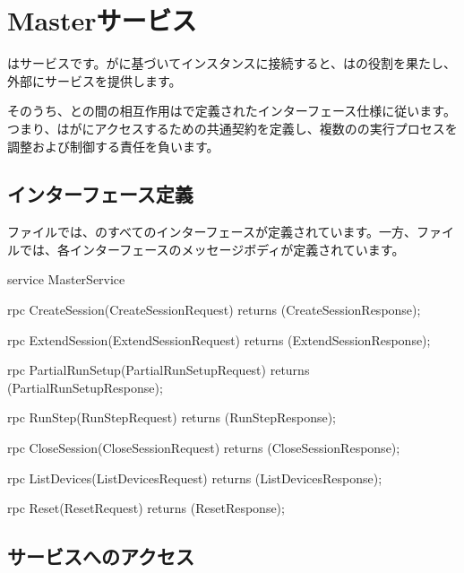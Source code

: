 \section{Masterサービス}

\begin{content}

はサービスです。がに基づいてインスタンスに接続すると、はの役割を果たし、外部にサービスを提供します。

そのうち、との間の相互作用はで定義されたインターフェース仕様に従います。つまり、はがにアクセスするための共通契約を定義し、複数のの実行プロセスを調整および制御する責任を負います。

\subsection{インターフェース定義}

ファイルでは、のすべてのインターフェースが定義されています。一方、ファイルでは、各インターフェースのメッセージボディが定義されています。

\begin{leftbar}
\begin{c++}
service MasterService {
  rpc CreateSession(CreateSessionRequest) 
      returns (CreateSessionResponse);
  
  rpc ExtendSession(ExtendSessionRequest) 
      returns (ExtendSessionResponse);

  rpc PartialRunSetup(PartialRunSetupRequest) 
      returns (PartialRunSetupResponse);

  rpc RunStep(RunStepRequest) 
      returns (RunStepResponse);
  
  rpc CloseSession(CloseSessionRequest) 
      returns (CloseSessionResponse);
  
  rpc ListDevices(ListDevicesRequest) 
      returns (ListDevicesResponse);

  rpc Reset(ResetRequest) 
      returns (ResetResponse);
}
\end{c++}
\end{leftbar}

\subsection{サービスへのアクセス}


\end{content}
